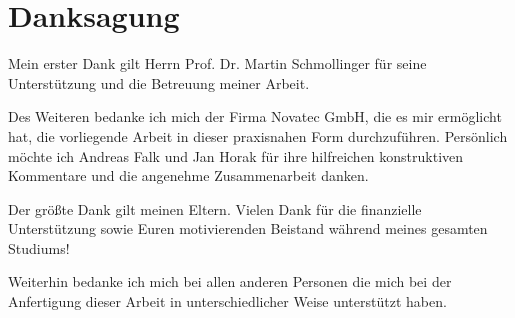 \chapter{\textbf{Danksagung}} 	%

Mein erster Dank gilt Herrn Prof. Dr. Martin Schmollinger für seine Unterstützung und die Betreuung meiner Arbeit.

Des Weiteren bedanke ich mich der Firma Novatec GmbH, die es mir ermöglicht hat, die vorliegende Arbeit in dieser praxisnahen Form durchzuführen. Persönlich möchte ich Andreas Falk und Jan Horak für ihre hilfreichen konstruktiven Kommentare und die angenehme Zusammenarbeit danken.

Der größte Dank gilt meinen Eltern. Vielen Dank für die finanzielle Unterstützung sowie Euren motivierenden Beistand während meines gesamten Studiums!

Weiterhin bedanke ich mich bei allen anderen Personen die mich bei der Anfertigung dieser Arbeit in unterschiedlicher Weise unterstützt haben.




